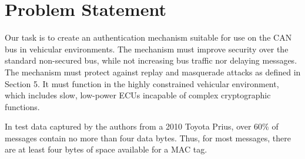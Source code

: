 \section{Problem Statement}
\label{problem}

Our task is to create an authentication mechanism suitable for use on the CAN bus in vehicular environments. 
The mechanism must improve security over the standard non-secured bus, while 
not increasing bus traffic nor delaying messages.
The mechanism must protect against replay and masquerade attacks as defined in Section 5.
It must function in the highly constrained vehicular environment,
which includes slow, low-power ECUs incapable of complex cryptographic functions.


In test data captured by the authors from a 2010 Toyota Prius, 
over 60\% of messages contain no more than four data bytes. 
Thus, for most messages, there are at least four bytes of space
available for a MAC tag.

